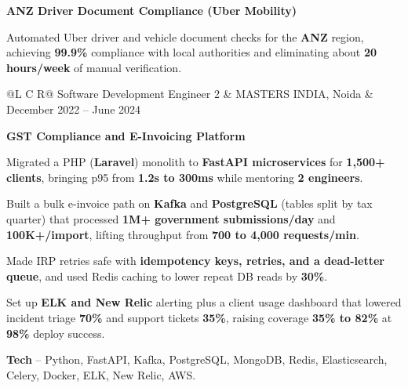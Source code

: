 \textcolor{Project}{\textbf{ANZ Driver Document Compliance (Uber Mobility)}}
\vspace{-1ex}
\begin{zitemize}
    \item Automated Uber driver and vehicle document checks for the \textbf{ANZ} region, achieving \textbf{99.9\%} compliance with local authorities and eliminating about \textbf{20 hours/week} of manual verification.
\end{zitemize}

\vspace{0.15ex}
\noindent
\begin{tabularx}{\textwidth}{@{}L C R@{}}
\textcolor{role}{Software Development Engineer 2} & \textcolor{company}{MASTERS INDIA, Noida} & \textcolor{date}{December 2022 -- June 2024}\\
\end{tabularx}
\vspace{-2ex}

\textcolor{Project}{\textbf{GST Compliance and E-Invoicing Platform}}
\vspace{-1ex}
\begin{zitemize}
    \item Migrated a PHP (\textbf{Laravel}) monolith to \textbf{FastAPI microservices} for \textbf{1,500+ clients}, bringing p95 from \textbf{1.2s to 300ms} while mentoring \textbf{2 engineers}.
    \item Built a bulk e-invoice path on \textbf{Kafka} and \textbf{PostgreSQL} (tables split by tax quarter) that processed \textbf{1M+ government submissions/day} and \textbf{100K+/import}, lifting throughput from \textbf{700 to 4,000 requests/min}.
    \item Made IRP retries safe with \textbf{idempotency keys, retries, and a dead-letter queue}, and used Redis caching to lower repeat DB reads by \textbf{30\%}.
    \item Set up \textbf{ELK and New Relic} alerting plus a client usage dashboard that lowered incident triage \textbf{70\%} and support tickets \textbf{35\%}, raising coverage \textbf{35\% to 82\%} at \textbf{98\%} deploy success.
    \item \textbf{Tech} -- Python, FastAPI, Kafka, PostgreSQL, MongoDB, Redis, Elasticsearch, Celery, Docker, ELK, New Relic, AWS.
\end{zitemize}

